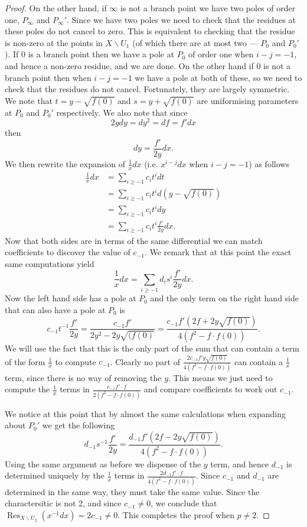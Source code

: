 \documentclass[draft, 11pt]{article} %
\theoremstyle{plain}
\theoremstyle{remark}
\DeclareMathOperator{\res}{Res}
\begin{document}
\begin{proof}
On the other hand, if $\infty$ is not a branch point we have two poles of order one, $P_\infty$ and $P_\infty'$.
Since we have two poles we need to check that the residues at these poles do not cancel to zero.
This is equivalent to checking that the residue is non-zero at the points in $X\backslash U_1$ (of which there are at most two --- $P_0$ and $P_0'$).
If $0$ is a branch point then we have a pole at $P_0$ of order one when $i-j=-1$, and hence a non-zero residue, and we are done.
On the other hand if $0$ is not a branch point then when $i-j=-1$ we have a pole at both of these, so we need to check that the residues do not cancel.
Fortunately, they are largely symmetric.
We note that $t=y-\sqrt{f(0)}$ and $s=y+\sqrt{f(0)}$ are uniformising parameters at $P_0$ and $P_0'$ respectively.
We also note that since
\[
2ydy = dy^2 = df = f'dx
\]
then
\[
dy=\frac{f'}{2y}dx.
\]
We then rewrite the expansion of $\frac{1}{x}dx$ (i.e. $x^{i-j}dx$ when $i-j=-1$) as follows
\begin{align*}
\frac{1}{x}dx & = \sum_{i\geq -1}c_it^i dt \\
& = \sum_{i\geq -1}c_it^i d\left(y-\sqrt{f(0)}\right)\\
& = \sum_{i\geq -1}c_it^i dy \\
& = \sum_{i\geq -1}c_it^i \frac{f'}{2y}dx.
\end{align*}
Now that both sides are in terms of the same differential we can match coefficients to discover the value of $c_{-1}$.
We remark that at this point the exact same computations yield
\[
\frac{1}{x}dx = \sum_{i\geq -1}d_is^i \frac{f'}{2y}dx.
\]
Now the left hand side has a pole at $P_0$ and the only term on the right hand side that can also have a pole at $P_0$ is 
\[
c_{-1}t^{-1}\frac{f'}{2y} = \frac{c_{-1}f'}{2y^2 - 2y\sqrt{(f(0)}} = \frac{c_{-1}f'\left( 2f+2y\sqrt{f(0)}\right) }{4(f^2-f\cdot f(0))}.
\]
We will use the fact that this is the only part of the sum that can contain a term of the form $\frac{1}{x}$ to compute $c_{-1}$.
Clearly no part of $\frac{2c_{-1}f'y\sqrt{f(0)}}{4(f^2-f\cdot f(0))}$ can contain a $\frac{1}{x}$ term, since there is no way of removing the $y$.
This means we just need to compute the $\frac{1}{x}$ terms in $\frac{c_{-1}f'\cdot f}{2(f^2-f\cdot f(0))}$ and compare coefficients to work out $c_{-1}$.

We notice at this point that by almost the same calculations when expanding about $P_0'$ we get the following
\[
d_{-1}s^{-1}\frac{f'}{2y} = \frac{d_{-1}f'\left(2f-2y\sqrt{f(0)}\right) }{4(f^2 - f\cdot f(0))}.
\]
Using the same argument as before we dispense of the $y$ term, and hence $d_{-1}$ is determined uniquely by the $\frac{1}{x}$ terms in $\frac{2d_{-1}f' \cdot f}{4(f^2-f\cdot f(0))}$.
Since $c_{-1}$ and $d_{-1}$ are determined in the same way, they must take the same value. 
Since the charactersitic is not 2, and since $c_{-1} \neq 0$, we conclude that $\res_{X\backslash U_2}(x^{-1}dx) = 2c_{-1} \neq 0$.
This completes the proof when $p \neq 2$.


\end{proof}
\end{document}
